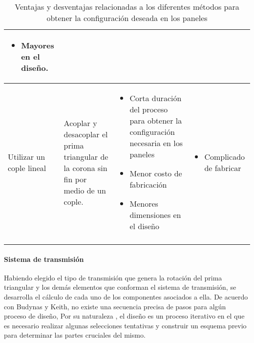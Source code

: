 \begin{center}
\begin{longtable}[!htb]{| m{7em} | m{10em} | m{12em}| m{12em}|}
\begin{itemize}
        \item Mayores en el diseño.
    \end{itemize}\\
    \hline
Utilizar un cople lineal & Acoplar y desacoplar el prima triangular de la corona sin fin por medio de un cople.&
    \begin{itemize}
        \item Corta duración del proceso para obtener la configuración necesaria en los paneles
        \item Menor costo de fabricación
        \item Menores dimensiones en el diseño
    \end{itemize}
    & 
    \begin{itemize}
        \item Complicado de fabricar
    \end{itemize}\\
    \hline
    \caption{Ventajas y desventajas relacionadas a los diferentes métodos para obtener la configuración deseada en los paneles}
    \label{tab:ComConfigPaneles}
    \end{longtable}
\end{center}

\paragraph{Sistema de transmisión}\hfill \break

Habiendo elegido el tipo de transmisión que genera la rotación del prima triangular y los demás elementos que conforman el sistema de transmisión, se desarrolla el cálculo de cada uno de los componentes asociados a ella. De acuerdo con Budynas y Keith\cite{Shigley2012}, no existe una secuencia precisa de pasos para algún proceso de diseño, Por su naturaleza , el diseño es un proceso iterativo en el que es necesario realizar algunas selecciones tentativas y construir un esquema previo para determinar las partes cruciales del mismo.
    
